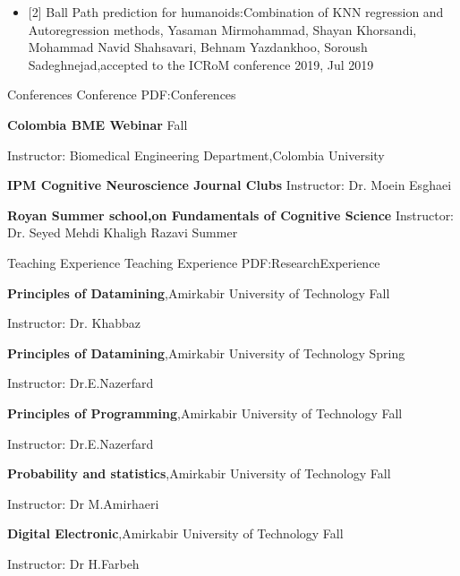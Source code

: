 \documentclass[letterpaper,MMMyyyy,nonstopmode]{simpleresumecv}
\begin{document}
\begin{Body}
\begin{itemize}
\item
{[2] Ball Path prediction for humanoids:Combination of KNN regression and Autoregression methods, Yasaman Mirmohammad, Shayan Khorsandi, Mohammad Navid Shahsavari, Behnam Yazdankhoo, Soroush Sadeghnejad,accepted to the ICRoM conference 2019, Jul 2019}
\end{itemize}

\Section
{Conferences}
{Conference}
{PDF:Conferences}

\Entry
\textbf{Colombia BME Webinar}
\hfill
Fall 

\BulletItem
Instructor: Biomedical Engineering Department,Colombia University 

\Entry
\textbf{IPM Cognitive Neuroscience Journal Clubs}
\BulletItem
Instructor: Dr. Moein Esghaei
\hfill
{}

\Entry
\textbf{Royan Summer school,on Fundamentals of Cognitive Science}
\BulletItem
Instructor: Dr. Seyed Mehdi Khaligh Razavi
\hfill
Summer



\Section
{Teaching Experience}
{Teaching Experience}
{PDF:ResearchExperience}

\Entry
\textbf{Principles of Datamining},Amirkabir University of Technology
\hfill
Fall 

\BulletItem
Instructor: Dr. Khabbaz

\Entry
\textbf{Principles of Datamining},Amirkabir University of Technology
\hfill
Spring 

\BulletItem
Instructor: Dr.E.Nazerfard

\Entry
\textbf{Principles of Programming},Amirkabir University of Technology
\hfill
Fall

\BulletItem
Instructor: Dr.E.Nazerfard

\Entry
\textbf{Probability and statistics},Amirkabir University of Technology
\hfill
Fall

\BulletItem
Instructor: Dr M.Amirhaeri

\Entry
\textbf{Digital Electronic},Amirkabir University of Technology
\hfill
Fall

\BulletItem
Instructor: Dr H.Farbeh



\end{Body}
\end{document}
